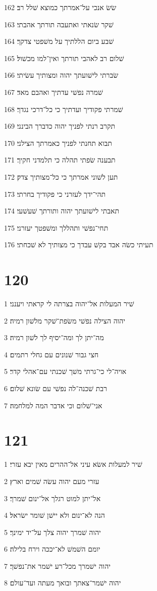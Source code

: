 \par 162 שׂשׂ אנכי על־אמרתך כמוצא שׁלל רב׃
\par 163 שׁקר שׂנאתי ואתעבה תורתך אהבתי׃
\par 164 שׁבע ביום הללתיך על משׁפטי צדקך׃
\par 165 שׁלום רב לאהבי תורתך ואין־למו מכשׁול׃
\par 166 שׂברתי לישׁועתך יהוה ומצותיך עשׂיתי׃
\par 167 שׁמרה נפשׁי עדתיך ואהבם מאד׃
\par 168 שׁמרתי פקודיך ועדתיך כי כל־דרכי נגדך׃
\par 169 תקרב רנתי לפניך יהוה כדברך הבינני׃
\par 170 תבוא תחנתי לפניך כאמרתך הצילני׃
\par 171 תבענה שׂפתי תהלה כי תלמדני חקיך׃
\par 172 תען לשׁוני אמרתך כי כל־מצותיך צדק׃
\par 173 תהי־ידך לעזרני כי פקודיך בחרתי׃
\par 174 תאבתי לישׁועתך יהוה ותורתך שׁעשׁעי׃
\par 175 תחי־נפשׁי ותהללך ומשׁפטך יעזרני׃
\par 176 תעיתי כשׂה אבד בקשׁ עבדך כי מצותיך לא שׁכחתי׃

\chapter{120}

\par 1 שׁיר המעלות אל־יהוה בצרתה לי קראתי ויענני׃
\par 2 יהוה הצילה נפשׁי משׂפת־שׁקר מלשׁון רמיה׃
\par 3 מה־יתן לך ומה־יסיף לך לשׁון רמיה׃
\par 4 חצי גבור שׁנונים עם גחלי רתמים׃
\par 5 אויה־לי כי־גרתי משׁך שׁכנתי עם־אהלי קדר׃
\par 6 רבת שׁכנה־לה נפשׁי עם שׂונא שׁלום׃
\par 7 אני־שׁלום וכי אדבר המה למלחמה׃

\chapter{121}

\par 1 שׁיר למעלות אשׂא עיני אל־ההרים מאין יבא עזרי׃
\par 2 עזרי מעם יהוה עשׂה שׁמים וארץ׃
\par 3 אל־יתן למוט רגלך אל־ינום שׁמרך׃
\par 4 הנה לא־ינום ולא יישׁן שׁומר ישׂראל׃
\par 5 יהוה שׁמרך יהוה צלך על־יד ימינך׃
\par 6 יומם השׁמשׁ לא־יככה וירח בלילה׃
\par 7 יהוה ישׁמרך מכל־רע ישׁמר את־נפשׁך׃
\par 8 יהוה ישׁמר־צאתך ובואך מעתה ועד־עולם׃


